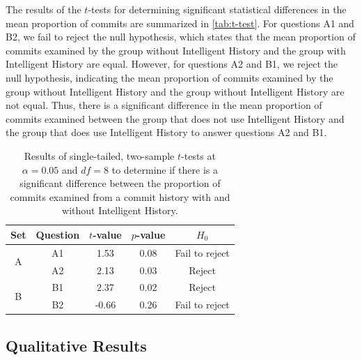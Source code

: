 The results of the $t$-tests for determining significant statistical differences in the mean proportion of commits are summarized in \autoref{tab:t-test}.
For questions A1 and B2, we fail to reject the null hypothesis, which states that the mean proportion of commits examined by the group without Intelligent History and the group with Intelligent History are equal.
However, for questions A2 and B1, we reject the null hypothesis, indicating the mean proportion of commits examined by the group without Intelligent History and the group without Intelligent History are not equal.
Thus, there is a significant difference in the mean proportion of commits examined between the group that does not use Intelligent History and the group that does use Intelligent History to answer questions A2 and B1.

\begin{table}[h]
  \caption{
    Results of single-tailed, two-sample $t$-tests at $\alpha = 0.05$ and $df = 8$ to determine if there is a significant difference between the proportion of commits examined from a commit history
    with and without Intelligent History.
  }
  \centering
  \begin{tabular}{@{}ccccc@{}}
    \toprule
    Set                                     & Question               & \multicolumn{1}{c}{$t$-value} & \multicolumn{1}{c}{$p$-value} & $H_{0}$ \\ \midrule
    \multicolumn{1}{c|}{\multirow{2}{*}{A}} & \multicolumn{1}{c|}{A1} & 1.53                        & 0.08                        & Fail to reject   \\ \cmidrule(l){2-5} 
    \multicolumn{1}{c|}{}                   & \multicolumn{1}{c|}{A2} & 2.13                        & 0.03                        & Reject   \\ \midrule
    \multicolumn{1}{c|}{\multirow{2}{*}{B}} & \multicolumn{1}{c|}{B1} & 2.37                        & 0.02                        & Reject   \\ \cmidrule(l){2-5} 
    \multicolumn{1}{c|}{}                   & \multicolumn{1}{c|}{B2} & -0.66                       & 0.26                        & Fail to reject   \\ \bottomrule
  \end{tabular}
  \label{tab:t-test}
\end{table}

\subsection{Qualitative Results}

